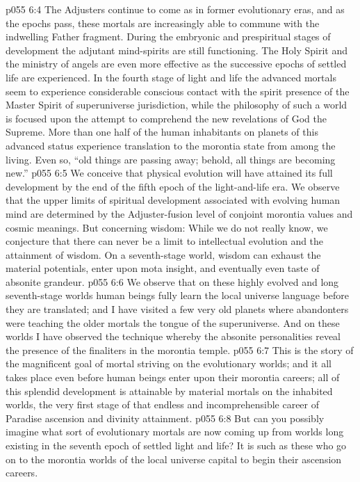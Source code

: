 \vs p055 6:4 \pc The Adjusters continue to come as in former evolutionary eras, and as the epochs pass, these mortals are increasingly able to commune with the indwelling Father fragment. During the embryonic and prespiritual stages of development the adjutant mind\hyp{}spirits are still functioning. The Holy Spirit and the ministry of angels are even more effective as the successive epochs of settled life are experienced. In the fourth stage of light and life the advanced mortals seem to experience considerable conscious contact with the spirit presence of the Master Spirit of superuniverse jurisdiction, while the philosophy of such a world is focused upon the attempt to comprehend the new revelations of God the Supreme. More than one half of the human inhabitants on planets of this advanced status experience translation to the morontia state from among the living. Even so, “old things are passing away; behold, all things are becoming new.”
\vs p055 6:5 We conceive that physical evolution will have attained its full development by the end of the fifth epoch of the light\hyp{}and\hyp{}life era. We observe that the upper limits of spiritual development associated with evolving human mind are determined by the Adjuster\hyp{}fusion level of conjoint morontia values and cosmic meanings. But concerning wisdom: While we do not really know, we conjecture that there can never be a limit to intellectual evolution and the attainment of wisdom. On a seventh\hyp{}stage world, wisdom can exhaust the material potentials, enter upon mota insight, and eventually even taste of absonite grandeur.
\vs p055 6:6 We observe that on these highly evolved and long seventh\hyp{}stage worlds human beings fully learn the local universe language before they are translated; and I have visited a few very old planets where abandonters were teaching the older mortals the tongue of the superuniverse. And on these worlds I have observed the technique whereby the absonite personalities reveal the presence of the finaliters in the morontia temple.
\vs p055 6:7 \pc This is the story of the magnificent goal of mortal striving on the evolutionary worlds; and it all takes place even before human beings enter upon their morontia careers; all of this splendid development is attainable by material mortals on the inhabited worlds, the very first stage of that endless and incomprehensible career of Paradise ascension and divinity attainment.
\vs p055 6:8 But can you possibly imagine what sort of evolutionary mortals are now coming up from worlds long existing in the seventh epoch of settled light and life? It is such as these who go on to the morontia worlds of the local universe capital to begin their ascension careers.

